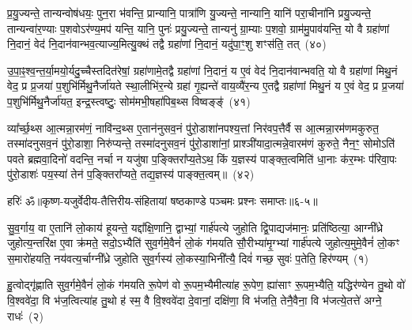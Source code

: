 प्र॒यु॒ज्यन्ते॒ तान्यन्वोष॑धयः॒ पुन॒रा भ॑वन्ति॒ प्रान्यानि॒ पात्रा॑णि यु॒ज्यन्ते॒ नान्यानि॒ यानि॑ परा॒चीना॑नि प्रयु॒ज्यन्ते॒ तान्यन्वा॑र॒ण्याः प॒शवो\-ऽर॑ण्य॒मप॑ यन्ति॒ यानि॒ पुनः॑ प्रयु॒ज्यन्ते॒ तान्यनु॑ ग्रा॒म्याः प॒शवो॒ ग्राम॑मु॒पाव॑यन्ति॒ यो वै ग्रहा॑णां नि॒दानं॒ वेद॑ नि॒दान॑वान्भव॒त्याज्य॒मित्यु॒क्थं तद्वै ग्रहा॑णां नि॒दानं॒ यदु॑पा॒ꣳ॒शु शꣳस॑ति॒ तत्~(४०)\ip

उ॒पा॒ꣴ॒श्व॒न्त॒र्या॒मयो॒र्यदु॒च्चैस्तदित॑रेषां॒ ग्रहा॑णामे॒तद्वै ग्रहा॑णां नि॒दानं॒ य ए॒वं वेद॑ नि॒दान॑वान्भवति॒ यो वै ग्रहा॑णां मिथु॒नं वेद॒ प्र प्र॒जया॑ प॒शुभि॑र्मिथु॒नैर्जा॑यते स्था॒लीभि॑र॒न्ये ग्रहा॑ गृ॒ह्यन्ते॑ वाय॒व्यै॑र॒न्य ए॒तद्वै ग्रहा॑णां मिथु॒नं य ए॒वं वेद॒ प्र प्र॒जया॑ प॒शुभि॑र्मिथु॒नैर्जा॑यत॒ इन्द्र॒स्त्वष्टुः॒ सोम॑मभी॒षहा॑पिब॒थ्स विष्वङ्ङ्॑~(४१)\ip

व्या᳚र्च्छ॒थ्स आ॒त्मन्ना॒रम॑णं॒ नावि॑न्द॒थ्स ए॒तान॑नुसव॒नं पु॑रो॒डाशा॑नपश्य॒त्तां निर॑वप॒त्तैर्वै स आ॒त्मन्ना॒रम॑णमकुरुत॒ तस्मा॑दनुसव॒नं पु॑रो॒डाशा॒ निरु॑प्यन्ते॒ तस्मा॑दनुसव॒नं पु॑रो॒डाशा॑नां॒ प्राश्ञी॑यादा॒त्मन्ने॒वारम॑णं कुरुते॒ नैन॒ꣳ॒ सोमो\-ऽति॑ पवते ब्रह्मवा॒दिनो॑ वदन्ति॒ नर्चा न यजु॑षा प॒ङ्क्तिरा᳚प्य॒ते\-ऽथ॒ किं य॒ज्ञस्य॑ पाङ्क्त॒त्वमिति॑ धा॒नाः क॑र॒म्भः प॑रिवा॒पः पु॑रो॒डाशः॑ पय॒स्या॑ तेन॑ प॒ङ्क्तिरा᳚प्यते॒ तद्य॒ज्ञस्य॑ पाङ्क्त॒त्वम्॥~(४२)\ip

{\anuvakamend[{भ॒व॒न्ति॒ यानि॒ पुनः॒ शꣳस॑ति॒ तद्विष्व॒ङ्किञ्चतु॑र्दश च}]}%

{हरिः॑ ॐ}{॥कृष्ण-यजुर्वेदीय-तैत्तिरीय-संहितायां षष्ठकाण्डे पञ्चमः प्रश्नः समाप्तः॥६-५॥}



\setcounter{anuvakam}{0}
सु॒व॒र्गाय॒ वा ए॒तानि॑ लो॒काय॑ हूयन्ते॒ यद्दा᳚क्षि॒णानि॒ द्वाभ्यां॒ गार्\mbox{}ह॑पत्ये जुहोति द्वि॒पाद्यज॑मानः॒ प्रति॑ष्ठित्या॒ आग्नी᳚ध्रे जुहोत्य॒न्तरि॑क्ष ए॒वा क्र॑मते॒ सदो॒\-ऽभ्यैति॑ सुव॒र्गमे॒वैनं॑ लो॒कं ग॑मयति सौ॒रीभ्या॑मृ॒ग्भ्यां गार्\mbox{}ह॑पत्ये जुहोत्य॒मुमे॒वैनं॑ लो॒कꣳ स॒मारो॑हयति॒ नय॑वत्य॒र्चाग्नी᳚ध्रे जुहोति सुव॒र्गस्य॑ लो॒कस्या॒भिनी᳚त्यै॒ दिवं॑ गच्छ॒ सुवः॑ प॒तेति॒ हिर॑ण्यम्~(१)\ip

हु॒त्वोद्गृ॑ह्णाति सुव॒र्गमे॒वैनं॑ लो॒कं ग॑मयति रू॒पेण॑ वो रू॒पम॒भ्यैमीत्या॑ह रू॒पेण॒ ह्या॑साꣳ रू॒पम॒भ्यैति॒ यद्धिर॑ण्येन तु॒थो वो॑ वि॒श्ववे॑दा॒ वि भ॑ज॒त्वित्या॑ह तु॒थो ह॑ स्म॒ वै वि॒श्ववे॑दा दे॒वानां॒ दक्षि॑णा॒ वि भ॑जति॒ तेनै॒वैना॒ वि भ॑जत्ये॒तत्ते॑ अग्ने॒ राधः॑~(२)\ip

